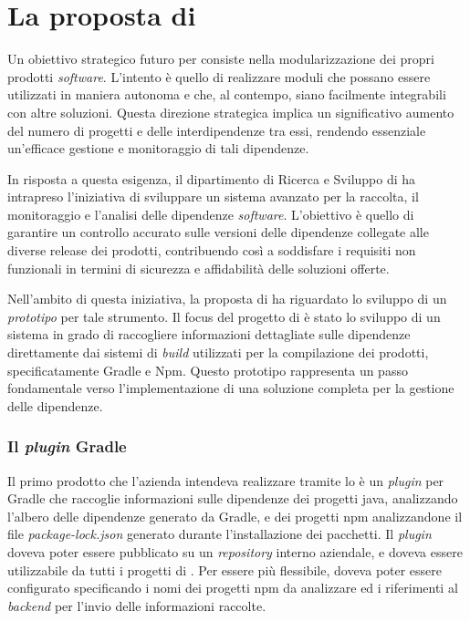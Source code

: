 \section{La proposta di \stage}

Un obiettivo strategico futuro per {\azienda} consiste nella modularizzazione dei propri prodotti \textit{software}. 
L'intento è quello di realizzare moduli che possano essere utilizzati in maniera autonoma e che, al contempo, 
siano facilmente integrabili con altre soluzioni. Questa direzione strategica implica un significativo aumento
del numero di progetti e delle interdipendenze tra essi, rendendo essenziale un'efficace gestione e monitoraggio di tali dipendenze.

In risposta a questa esigenza, il dipartimento di Ricerca e Sviluppo di {\azienda} ha intrapreso l'iniziativa 
di sviluppare un sistema avanzato per la raccolta, il monitoraggio e l'analisi delle dipendenze \textit{software}. 
L'obiettivo è quello di garantire un controllo accurato sulle versioni delle dipendenze collegate alle diverse release dei prodotti, 
contribuendo così a soddisfare i requisiti non funzionali in termini di sicurezza e affidabilità delle soluzioni offerte.

Nell'ambito di questa iniziativa, la proposta di \stage{} ha riguardato lo sviluppo di un \textit{\gls{prototipo}} per tale strumento. 
Il focus del progetto di \stage{} è stato lo sviluppo di un sistema in grado di raccogliere informazioni dettagliate sulle dipendenze 
direttamente dai sistemi di \textit{build} utilizzati per la compilazione dei prodotti, specificatamente \gls{Gradle} e \gls{Npm}. 
Questo prototipo rappresenta un passo fondamentale verso l'implementazione di una soluzione completa per la gestione delle dipendenze.

\subsubsection*{Il \textit{plugin} Gradle}
Il primo prodotto che l'azienda intendeva realizzare tramite lo \stage{} è un \textit{plugin} per Gradle che raccoglie informazioni sulle dipendenze dei progetti java, 
analizzando l'albero delle dipendenze generato da Gradle, e dei progetti npm analizzandone il file \textit{package-lock.json} generato
durante l'installazione dei pacchetti.
Il \textit{plugin} doveva poter essere pubblicato su un \textit{repository} interno aziendale, e doveva essere utilizzabile da tutti i progetti di {\azienda}.
Per essere più flessibile, doveva poter essere configurato specificando i nomi dei progetti npm da analizzare
ed i riferimenti al \textit{backend} per l'invio delle informazioni raccolte.\\

